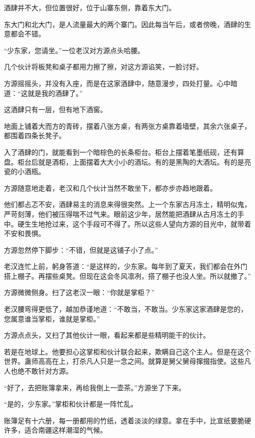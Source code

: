 
\begin{this_body}

酒肆并不大，但位置很好，位于山寨东侧，靠着东大门。

东大门和北大门，是人流量最大的两个寨门。因此每当午后，或者傍晚，酒肆的生意都会不错。

“少东家，您请坐。”一位老汉对方源点头哈腰。

几个伙计将板凳和桌子都用力擦了擦，对这方源谄笑，一脸讨好。

方源摇摇头，并没有入座，而是在这家酒肆中，随意漫步，四处打量。心中暗道：“这就是我的酒肆了。”

这酒肆只有一层，但有地下酒窖。

地面上铺着大而方的青砖，摆着八张方桌，有两张方桌靠着墙壁，其余六张桌子，都围着四条长凳子。

入了酒肆的门，就能看到一个暗棕色的长条柜台。柜台上摆着笔墨纸砚，还有算盘。柜台后就是酒柜，上面摆着大大小小的酒坛。有的是黑陶的大酒坛。有的是亮瓷的小酒瓶。

方源随意地走着，老汉和几个伙计当然不敢坐下，都亦步亦趋地跟着。

他们都忐忑不安，酒肆易主的消息来得很突然。上一个东家古月冻土，精明似鬼，严苛刻薄，他们被压得喘不过气来。眼前这少年，居然能把酒肆从古月冻土的手中。硬生生地抢过来，这个手段可不得了。所以这些人望向方源的目光中，就带着不安和畏惧。

方源忽然停下脚步：“不错，但就是这铺子小了点。”

老汉连忙上前，躬身答道：“是这样的，少东家。每年到了夏天，我们都会在外门搭上棚子。再摆些桌凳。但现在这会冬风凛冽，搭了棚子也没人坐。所以就撤了。”

方源微微侧身。扫了这老汉一眼：“你就是掌柜？”

老汉腰弯得更低了，越加恭谨地道：“不敢当，不敢当。少东家这家酒肆是您的，您属意谁当掌柜，谁就是掌柜。”

方源点点头，又扫了其他伙计一眼，看起来都是些精明能干的伙计。

若是在地球上。他要担心这掌柜和伙计联合起来，欺瞒自己这个主人。但是在这个世界。蛊师高高在上，打杀凡人只是一念之间。就算是舅父舅母撺掇指使。这些凡人也绝不敢针对方源。

“好了，去把账簿拿来，再给我倒上一壶茶。”方源坐了下来。

“是的，少东家。”掌柜和伙计都是一阵忙乱。

账簿足有十六册，每一册都用的竹纸，透着淡淡的绿意。拿在手中，比宣纸要脆硬许多，适合南疆这样潮湿的气候。


\end{this_body}
